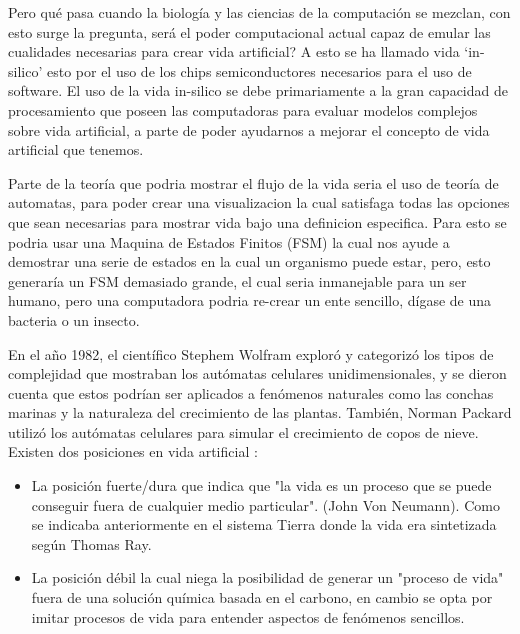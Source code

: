 \documentclass[conference]{IEEEtran}
\begin{document}
Pero qu\'e pasa cuando la biolog\'ia y las ciencias de la computaci\'on se mezclan, con esto surge la pregunta, ser\'a el poder computacional actual capaz de emular las cualidades necesarias para crear vida artificial? A esto se ha llamado vida `in-silico' \cite{artificiallifeLevy, lifeStanfordPhi} esto por el uso de los chips semiconductores necesarios para el uso de software. El uso de la vida in-silico se debe primariamente a la gran capacidad de procesamiento que poseen las computadoras para evaluar modelos complejos sobre vida artificial, a parte de poder ayudarnos a mejorar el concepto de vida artificial que tenemos. 

Parte de la teor\'ia que podria mostrar el flujo de la vida seria el uso de teor\'ia de automatas, para poder crear una visualizacion la cual satisfaga todas las opciones que sean necesarias para mostrar vida bajo una definicion especifica. Para esto se podria usar una Maquina de Estados Finitos (FSM) \cite{MARG01} la cual nos ayude a demostrar una serie de estados en la cual un organismo puede estar, pero, esto generar\'ia un FSM demasiado grande, el cual seria inmanejable para un ser humano, pero una computadora podria re-crear un ente sencillo, d\'igase de una bacteria o un insecto.  

En el a\~no 1982, el cient\'ifico Stephem Wolfram explor\'o y categoriz\'o los tipos de complejidad que mostraban los autómatas celulares unidimensionales, y se dieron cuenta que estos podr\'ian ser aplicados a fen\'omenos naturales como las conchas marinas y la naturaleza del crecimiento de las plantas. Tambi\'en, Norman Packard utiliz\'o los aut\'omatas celulares para simular el crecimiento de copos de nieve. \cite{VAD01} \\
Existen dos posiciones en vida artificial\cite{VAD01} :
\begin{itemize}
\item La posici\'on fuerte/dura que indica que "la vida es un proceso que se puede conseguir fuera de cualquier medio particular". (John Von Neumann). Como se indicaba anteriormente en el sistema Tierra donde la vida era sintetizada seg\'un Thomas Ray.
\item La posici\'on d\'ebil la cual niega la posibilidad de generar un "proceso de vida" fuera de una soluci\'on qu\'imica basada en el carbono, en cambio se opta por imitar procesos de vida para entender aspectos de fen\'omenos sencillos.
\end{itemize}
\end{document}
